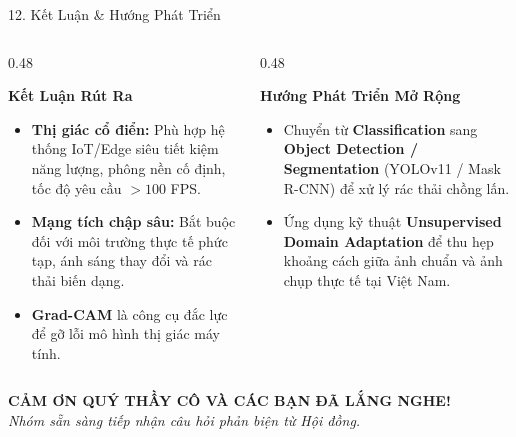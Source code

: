 \documentclass[aspectratio=169, 10pt]{beamer}
\begin{document}
\begin{frame}{12. Kết Luận \& Hướng Phát Triển}
\begin{columns}[T]
  \begin{column}{0.48\textwidth}
    \begin{block}{\textbf{Kết Luận Rút Ra}}
      \begin{itemize}
        \item \textbf{Thị giác cổ điển:} Phù hợp hệ thống IoT/Edge siêu tiết kiệm năng lượng, phông nền cố định, tốc độ yêu cầu $> 100$ FPS.
        \item \textbf{Mạng tích chập sâu:} Bắt buộc đối với môi trường thực tế phức tạp, ánh sáng thay đổi và rác thải biến dạng.
        \item \textbf{Grad-CAM} là công cụ đắc lực để gỡ lỗi mô hình thị giác máy tính.
      \end{itemize}
    \end{block}
  \end{column}

  \begin{column}{0.48\textwidth}
    \begin{block}{\textbf{Hướng Phát Triển Mở Rộng}}
      \begin{itemize}
        \item Chuyển từ \textbf{Classification} sang \textbf{Object Detection / Segmentation} (YOLOv11 / Mask R-CNN) để xử lý rác thải chồng lấn.
        \item Ứng dụng kỹ thuật \textbf{Unsupervised Domain Adaptation} để thu hẹp khoảng cách giữa ảnh chuẩn và ảnh chụp thực tế tại Việt Nam.
      \end{itemize}
    \end{block}
  \end{column}
\end{columns}

\vspace{0.3cm}
\centering
\Large \textbf{CẢM ƠN QUÝ THẦY CÔ VÀ CÁC BẠN ĐÃ LẮNG NGHE!}\\
\normalsize \textit{Nhóm sẵn sàng tiếp nhận câu hỏi phản biện từ Hội đồng.}
\end{frame}
\end{document}
